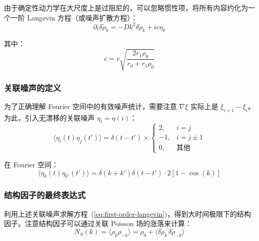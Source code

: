 由于确定性动力学在大尺度上是过阻尼的，可以忽略惯性项，将所有内容约化为一个一阶 Langevin 方程（或噪声扩散方程）：
\begin{equation}\label{eq:first-order-langevin}
\partial_t \delta\tilde{\rho}_k = -Dk^2\delta\tilde{\rho}_k + ic\eta_k
\end{equation}

其中：
\begin{equation}\label{eq:noise-strength}
c = v\sqrt{\frac{2r_1\rho_0}{r_0 + r_1\rho_0}}
\end{equation}

\subsubsection{关联噪声的定义}

为了正确理解 Fourier 空间中的有效噪声统计，需要注意 $\nabla\xi$ 实际上是 $\xi_{i+1} - \xi_i$。为此，引入无漂移的关联噪声 $\eta_i = \eta(i)$：
\begin{equation}\label{eq:correlated-noise}
\langle \eta_i(t)\eta_j(t') \rangle = \delta(t - t') \times \begin{cases} 2, & i = j \\ -1, & i = j \pm 1 \\ 0, & \text{其他} \end{cases}
\end{equation}

在 Fourier 空间：
\begin{equation}\label{eq:noise-fourier}
\langle \eta_k(t)\eta_{k'}(t') \rangle = \delta(k + k')\delta(t - t') \cdot 2[1 - \cos(k)]
\end{equation}

\subsubsection{结构因子的最终表达式}

利用上述关联噪声求解方程~(\ref{eq:first-order-langevin})，得到大时间极限下的结构因子。注意结构因子可以通过关联 Poisson 场的涨落来计算\cite{bertrand2019}：
\begin{equation}\label{eq:ns-definition}
N_S(k) = \langle \rho_k \rho_{-k} \rangle = \rho_0 + \langle \delta\tilde{\rho}_k \, \delta\tilde{\rho}_{-k} \rangle
\end{equation}

